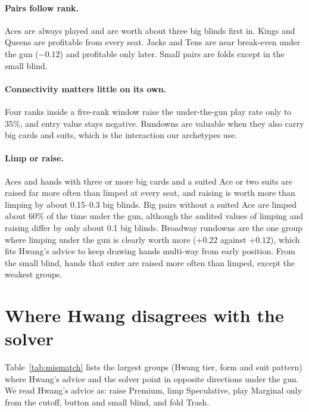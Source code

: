 \documentclass[10pt]{article}
\begin{document}
\paragraph{Pairs follow rank.} Aces are always played and are worth about three big blinds first in.
Kings and Queens are profitable from every seat. Jacks and Tens are near break-even under the gun
($-0.12$) and profitable only later. Small pairs are folds except in the small blind.

\paragraph{Connectivity matters little on its own.} Four ranks inside a five-rank window raise the
under-the-gun play rate only to 35\%, and entry value stays negative. Rundowns are valuable when they
also carry big cards and suits, which is the interaction our archetypes use.

\paragraph{Limp or raise.} Aces and hands with three or more big cards and a suited Ace or two
suits are raised far more often than limped at every seat, and raising is worth more than limping
by about 0.15--0.3 big blinds. Big pairs without a suited Ace are limped about 60\% of the time under
the gun, although the audited values of limping and raising differ by only about 0.1 big blinds.
Broadway rundowns are the one group where limping under the gun is clearly worth more
($+0.22$ against $+0.12$), which fits Hwang's advice to keep drawing hands multi-way from early
position. From the small blind, hands that enter are raised more often than limped, except the
weakest groups.

\section{Where Hwang disagrees with the solver}
Table~\ref{tab:mismatch} lists the largest groups (Hwang tier, form and suit pattern) where Hwang's
advice and the solver point in opposite directions under the gun. We read Hwang's advice as: raise
Premium, limp Speculative, play Marginal only from the cutoff, button and small blind, and fold Trash.

\begin{table}[H]
\centering
\caption{Largest disagreements under the gun. Entry EV is the audited mean where available.}
\label{tab:mismatch}
\small

\end{table}
\end{document}
